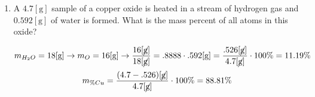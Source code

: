 \documentclass[12pt]{article}
\begin{document}
\begin{enumerate}
  \item A $4.7[\si{\gram}]$ sample of a copper oxide is heated in a stream of hydrogen gas and $0.592[\si{\gram}]$ of water is formed. What is the mass percent of all atoms in this oxide?

    $$m_{H_2O}=18[\si{\gram}]\rightarrow m_O=16[\si{\gram}]\rightarrow\frac{16[\cancel{\si{\gram}}]}{18[\cancel{\si{\gram}}]}=.8888\cdot.592[\si{\gram}]=\frac{.526[\cancel{\si{\gram}}]}{4.7[\cancel{\si{\gram}}]}\cdot100\%=11.19\%$$
    $$m_{\% Cu}=\frac{(4.7-.526)[\cancel{\si{\gram}}]}{4.7[\cancel{\si{\gram}}]}\cdot100\%=88.81\%$$
    

\end{enumerate}
\end{document}
